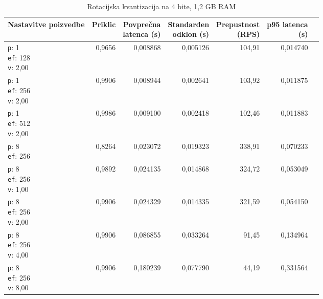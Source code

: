 \begin{table}[htbp]
  \centering
\small
  \caption{Rotacijska kvantizacija na 4 bite, 1,2 GB RAM}
  \label{tab:single-2cpu-1.2ram:tq4:qdrant-dipl-baseline-tenant-subgraph-tq4-ext-m16-ef-128-random-768-100-tenants-extended-upload-2026-08-19-07-52-50.json}
  \begin{tabularx}{\textwidth}{Xrrrrrr}
    \toprule
    Nastavitve poizvedbe & Priklic & \makecell{Povprečna\\latenca (s)} & \makecell{Standarden\\odklon (s)} & \makecell{Prepustnost\\(RPS)} & \makecell{p95 latenca\\(s)}  \\
    \midrule
    \makecell{\texttt{p}: 1\\\texttt{ef}: 128\\\texttt{v}: 2,00} & 0,9656 & 0,008868 & 0,005126 & 104,91 & 0,014740 \\
    \makecell{\texttt{p}: 1\\\texttt{ef}: 256\\\texttt{v}: 2,00} & 0,9906 & 0,008944 & 0,002641 & 103,92 & 0,011875 \\
    \makecell{\texttt{p}: 1\\\texttt{ef}: 512\\\texttt{v}: 2,00} & 0,9986 & 0,009100 & 0,002418 & 102,46 & 0,011883 \\
    \makecell{\texttt{p}: 8\\\texttt{ef}: 256} & 0,8264 & 0,023072 & 0,019323 & 338,91 & 0,070233 \\
    \makecell{\texttt{p}: 8\\\texttt{ef}: 256\\\texttt{v}: 1,00} & 0,9892 & 0,024135 & 0,014868 & 324,72 & 0,053049 \\
    \makecell{\texttt{p}: 8\\\texttt{ef}: 256\\\texttt{v}: 2,00} & 0,9906 & 0,024329 & 0,014335 & 321,59 & 0,054150 \\
    \makecell{\texttt{p}: 8\\\texttt{ef}: 256\\\texttt{v}: 4,00} & 0,9906 & 0,086855 & 0,033264 & 91,45 & 0,134964 \\
    \makecell{\texttt{p}: 8\\\texttt{ef}: 256\\\texttt{v}: 8,00} & 0,9906 & 0,180239 & 0,077790 & 44,19 & 0,331564 \\

\end{tabularx}
\end{table}
